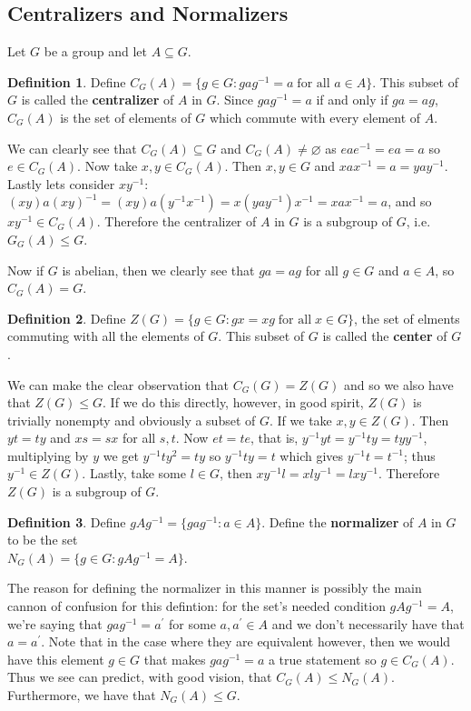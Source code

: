 \documentclass[9pt,reqno]{amsart}
\theoremstyle{definition}
\newtheorem{defi}{Definition}[section]
\newcommand{\pp}{\prime}
\begin{document}
\subsection{Centralizers and Normalizers}
Let $G$ be a group and let $A \subseteq G$.
\begin{defi}
	Define $C_G (A) = \{ g \in G \colon g a g^{-1} = a \; \text{for all $a \in A$} \}$. This subset of $G$ is called the \textbf{centralizer} of $A$ in $G$. Since $g a g^{-1} = a $ if and only if $ga = ag$, $C_G (A)$ is the set of elements of $G$ which commute with every element of $A$. 
\end{defi}
We can clearly see that $C_G (A) \subseteq G$ and $C_G (A) \neq \varnothing $ as $e a e^{-1} = e a = a $ so $e \in C_G (A)$. Now take $x, y \in C_G (A)$. Then $x, y \in G$ and $xax^{-1} = a = yay^{-1}$. Lastly lets consider $xy^{-1}$:$(xy) a (xy)^{-1} = (xy)a(y^{-1} x^{-1}) = x(yay^{-1})x^{-1} = xax^{-1} = a$, and so $xy^{-1} \in C_G (A)$. Therefore the centralizer of $A$ in $G$ is a subgroup of $G$, i.e. $G_G (A) \leq G$.

Now if $G$ is abelian, then we clearly see that $ga = ag$ for all $g \in G$ and $a \in A$, so $C_G (A) = G$. 
\begin{defi}
	Define $Z(G) = \{g \in G \colon gx = xg \; \text{for all}\;  x \in G \}$, the set of elments commuting with all the elements of $G$. This subset of $G$ is called the \textbf{center} of $G$.
\end{defi}
We can make the clear observation that $C_G (G) = Z(G)$ and so we also have that $Z (G) \leq G$. If we do this directly, however, in good spirit, $Z(G)$ is trivially nonempty and obviously a subset of $G$. If we take $x, y \in Z(G)$. Then $yt = ty$ and $xs = sx$ for all $s, t$. Now $et = te$, that is, $y^{-1} y t = y^{-1} t y = t y y^{-1}$, multiplying by $y$ we get $y^{-1} t y^2 = ty$ so $y^{-1} t y = t $ which gives $y^{-1} t = t^{-1}$; thus $y^{-1} \in Z(G)$. Lastly, take some $l \in G$, then $xy^{-1} l = x l y^{-1} = l xy^{-1}$. Therefore $Z(G)$ is a subgroup of $G$.

\begin{defi}
	Define $gAg^{-1} = \{ g a g^{-1} \colon a \in A \}$. Define the \textbf{normalizer} of $A$ in $G$ to be the set \\$N_G (A) = \{ g \in G \colon gAg^{-1} = A \}$. 
\end{defi}
The reason for defining the normalizer in this manner is possibly the main cannon of confusion for this defintion: for the set's needed condition $gAg^{-1} = A$, we're saying that $g a g^{-1} = a^\pp$ for some $a, a^\pp \in A$ and we don't necessarily have that $a = a^\pp$. Note that in the case where they are equivalent however,  then we would have this element $g \in G$ that makes $gag^{-1} = a$ a true statement so $g \in C_G(A)$. Thus we see can predict, with good vision, that $C_G (A) \leq N_G(A)$. Furthermore, we have that $N_G (A) \leq G$. 
\end{document}
